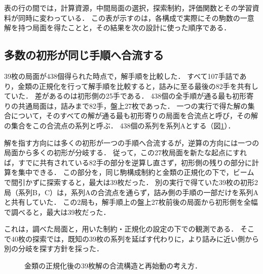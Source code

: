 \documentclass[english,submit]{ipsj}
\makeatletter
\renewcommand{\small}{\@setfontsize\small{8.53728pt}{12.80592pt}}
\makeatother
\begin{document}
表の行の間では，計算資源，中間局面の選択，探索制約，評価関数とその学習資料が同時に変わっている．
この表が示すのは，各構成で実際にその駒数の一意解を持つ局面を得たことと，その結果を次の設計に使った順序である．

\subsection{多数の初形が同じ手順へ合流する}
39枚の局面が438個得られた時点で，解手順を比較した．
すべて107手詰であり，金類の正規化を行って解手順を比較すると，詰みに至る最後の82手を共有していた．
差があるのは初形側の25手である．
438個の全手順が通る最も初形寄りの共通局面は，詰みまで82手，盤上27枚であった．
一つの実行で得た解の集合について，そのすべての解が通る最も初形寄りの局面を合流点と呼び，その解の集合をこの合流点の系列と呼ぶ．
438個の系列を系列Aとする（図\ref{fig:confluence}）．

解を指す方向には多くの初形が一つの手順へ合流するが，逆算の方向には一つの局面から多くの初形が分岐する．
従って，この27枚局面を新たな起点にすれば，すでに共有されている82手の部分を逆算し直さず，初形側の残りの部分に計算を集中できる．
この部分を，同じ駒構成制約と金類の正規化の下で，ビームで間引かずに探索すると，最大は39枚だった．
別の実行で得ていた39枚の初形2局（系列B，C）は，系列Aの合流点を通らず，詰み側の手順の一部だけを系列Aと共有していた．
この2局も，解手順上の盤上27枚前後の局面から初形側を全幅で調べると，最大は39枚だった．

これは，調べた局面と，用いた制約・正規化の設定の下での観測である．
そこで40枚の探索では，既知の39枚の系列を延ばす代わりに，より詰みに近い側から別の分岐を探す方針を採った．

\begin{figure}[t]
\centering
{}
\caption{金類の正規化後の39枚解の合流構造と再始動の考え方．}
\label{fig:confluence}
\end{figure}
\end{document}
